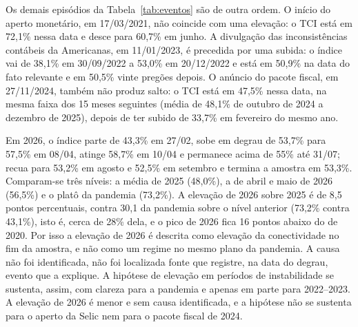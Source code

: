 Os demais episódios da Tabela~\ref{tab:eventos} são de outra ordem. O início do
aperto monetário, em 17/03/2021, não coincide com uma elevação: o TCI está em
72,1\% nessa data e desce para 60,7\% em junho. A divulgação das inconsistências
contábeis da Americanas, em 11/01/2023, é precedida por uma subida: o índice vai
de 38,1\% em 30/09/2022 a 53,0\% em 20/12/2022 e está em 50,9\% na data do fato
relevante e em 50,5\% vinte pregões depois. O anúncio do pacote fiscal, em
27/11/2024, também não produz salto: o TCI está em 47,5\% nessa data, na mesma
faixa dos 15 meses seguintes (média de 48,1\% de outubro de 2024 a dezembro de
2025), depois de ter subido de 33,7\% em fevereiro do mesmo ano.

Em 2026, o índice parte de 43,3\% em 27/02, sobe em degrau de 53,7\% para 57,5\%
em 08/04, atinge 58,7\% em 10/04 e permanece acima de 55\% até 31/07; recua para
53,2\% em agosto e 52,5\% em setembro e termina a amostra em 53,3\%. Comparam-se
três níveis: a média de 2025 (48,0\%), a de abril e maio de 2026 (56,5\%) e o
platô da pandemia (73,2\%). A elevação de 2026 sobre 2025 é de 8,5 pontos
percentuais, contra 30,1 da pandemia sobre o nível anterior (73,2\% contra
43,1\%), isto é, cerca de 28\% dela, e o pico de 2026 fica 16 pontos abaixo do de
2020. Por isso a elevação de 2026 é descrita como elevação da conectividade no
fim da amostra, e não como um regime no mesmo plano da pandemia. A causa não foi
identificada, não foi localizada fonte que registre, na data do degrau, evento
que a explique. A hipótese de elevação em períodos de instabilidade se sustenta,
assim, com clareza para a pandemia e apenas em parte para 2022--2023. A elevação
de 2026 é menor e sem causa identificada, e a hipótese não se sustenta para o
aperto da Selic nem para o pacote fiscal de 2024.

